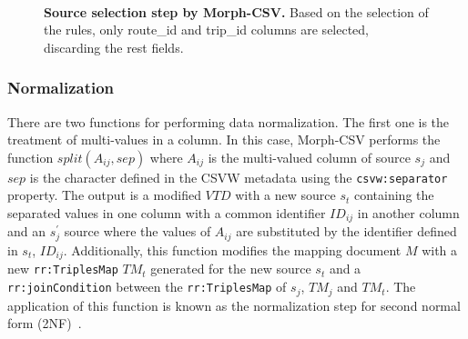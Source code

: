 \begin{figure}[th]
\centering
{}\\
\caption[Source selection step by Morph-CSV]{\textbf{Source selection step by Morph-CSV.} Based on the selection of the rules, only route\_id and trip\_id columns are selected, discarding the rest fields.}
\label{fig:selection2}
\end{figure}

\subsubsection*{Normalization}
There are two functions for performing data normalization. The first one is the treatment of multi-values in a column. In this case, Morph-CSV performs the function $split(A_{ij},sep)$ where $A_{ij}$ is the multi-valued column of source $s_{j}$ and $sep$ is the character defined in the CSVW metadata using the \texttt{csvw:separator} property. The output is a modified $VTD$ with a new source $s_t$ containing the separated values in one column with a common identifier $ID_{ij}$ in another column and an $s_{j}^{'}$ source where the values of $A_{ij}$ are substituted by the identifier defined in $s_t$, $ID_{ij}$. Additionally, this function modifies the mapping document $M$ with a new \texttt{rr:TriplesMap} $TM_t$ generated for the new source $s_t$ and a \texttt{rr:joinCondition} between the \texttt{rr:TriplesMap} of $s_j$, $TM_j$ and $TM_t$. The application of this function is known as the normalization step for second normal form (2NF)~\citep{codd1979extending}.
 
